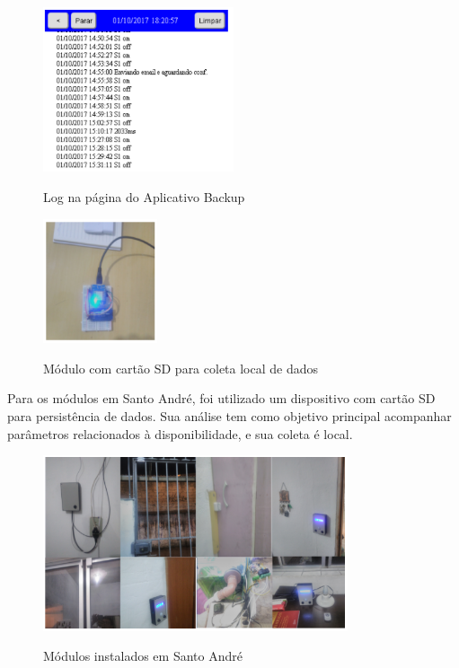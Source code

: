 \begin{figure}[H]
	\centering
	\caption{Log na página do Aplicativo Backup}
	\includegraphics[width=0.5\textwidth]{logAppBackup}
	\label{fig:logAppBackup}
\end{figure}

\begin{figure}[H]
	\centering
	\caption{Módulo com cartão SD para coleta local de dados}
	\includegraphics[width=0.3\textwidth]{SDColetaDados}
	\label{fig:SDColetaDados}
\end{figure}

Para os módulos em Santo André, foi utilizado um dispositivo com cartão SD para persistência de dados. Sua análise tem como objetivo principal acompanhar parâmetros relacionados à disponibilidade, e sua coleta é local.

\begin{figure}[H]
	\centering
	\caption{Módulos instalados em Santo André}
	\includegraphics[width=0.8\textwidth]{ModulosStoAndre}
	\label{fig:ModulosStoAndre}
\end{figure}

